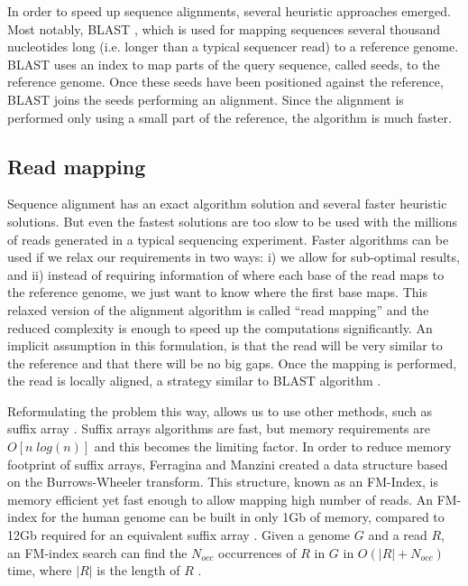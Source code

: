 In order to speed up sequence alignments, several heuristic approaches emerged. Most notably, BLAST \cite{altschul1990basic}, which is used for mapping sequences several thousand nucleotides long (i.e. longer than a typical sequencer read) to a reference genome. BLAST uses an index to map parts of the query sequence, called seeds, to the reference genome. Once these seeds have been positioned against the reference, BLAST joins the seeds performing an alignment. Since the alignment is performed only using a small part of the reference, the algorithm is much faster.  

\subsection{Read mapping}

Sequence alignment has an exact algorithm solution and several faster heuristic solutions. But even the fastest solutions are too slow to be used with the millions of reads generated in a typical sequencing experiment. Faster algorithms can be used if we relax our requirements in two ways: i) we allow for sub-optimal results, and ii) instead of requiring information of where each base of the read maps to the reference genome, we just want to know where the first base maps. This relaxed version of the alignment algorithm is called ``read mapping'' and the reduced complexity is enough to speed up the computations significantly. An implicit assumption in this formulation, is that the read will be very similar to the reference and that there will be no big gaps.  Once the mapping is performed, the read is locally aligned, a strategy similar to BLAST algorithm \cite{li2010fast, langmead2009ultrafast}.

Reformulating the problem this way, allows us to use other methods, such as suffix array \cite{durbin1998biological}. Suffix arrays algorithms are fast, but memory requirements are $O[ n \; log(n) ]$ and this becomes the limiting factor. In order to reduce memory footprint of suffix arrays, Ferragina and Manzini \cite{ferragina2000opportunistic} created a data structure based on the Burrows-Wheeler transform.  This structure, known as an FM-Index, is memory efficient yet fast enough to allow mapping high number of reads.  An FM-index for the human genome can be built in only 1Gb of memory, compared to 12Gb required for an equivalent suffix array \cite{li2010fast}.  Given a genome $G$ and a read $R$, an FM-index search can find the $N_{occ}$ occurrences of $R$ in $G$ in $O(|R| + N_{occ} )$ time, where $|R|$ is the length of $R$ \cite{li2010fast}.

